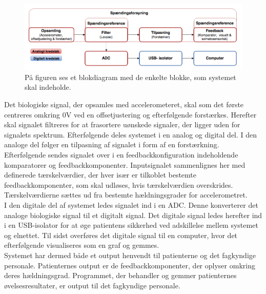 \begin{figure}[H]
	\centering
	\includegraphics[scale=0.7]{figures/cProblemloesning/blokdiagram.PNG}
	\caption{På figuren ses et blokdiagram med de enkelte blokke, som systemet skal indeholde.}
	\label{kravblok}
\end{figure}
Det biologiske signal, der opsamles med accelerometeret, skal som det første centreres omkring $0$V ved en offsetjustering og efterfølgende forstærkes. Herefter skal signalet filtreres for at frasortere uønskede signaler, der ligger uden for signalets spektrum. Efterfølgende deles systemet i en analog og digital del. I den analoge del følger en tilpasning af signalet i form af en forstærkning. Efterfølgende sendes signalet over i en feedbackkonfiguration indeholdende komparatorer og feedbackkomponenter. Inputsignalet sammenlignes her med definerede tærskelværdier, der hver især er tilkoblet bestemte feedbackkomponenter, som skal udløses, hvis tærskelværdien overskrides. Tærskelværdierne sættes ud fra bestemte hældningsgrader for accelerometret. \\
I den digitale del af systemet ledes signalet ind i en ADC. Denne konverterer det analoge biologiske signal til et digitalt signal. Det digitale signal ledes herefter ind i en USB-isolator for at øge patientens sikkerhed ved adskillelse mellem systemet og elnettet. Til sidst overføres det digitale signal til en computer, hvor det efterfølgende visualiseres som en graf og gemmes. \\
Systemet har dermed både et output henvendt til patienterne og det fagkyndige personale. Patienternes output er de feedbackkomponenter, der oplyser omkring deres hældningsgrad. Programmet, der behandler og gemmer patienternes øvelsesresultater, er output til det fagkyndige personale.

